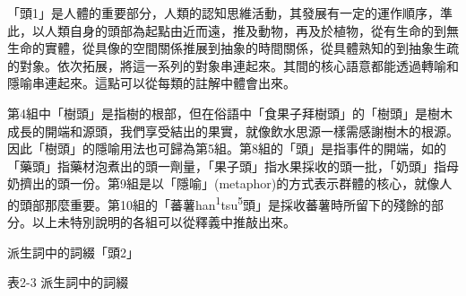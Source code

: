 \textrm{「頭1」是人體的重要部分，人類的認知思維活動，其發展有一定的運作順序，準此，以人類自身的頭部為起點由近而遠，推及動物，再及於植物，從有生命的到無生命的實體，從具像的空間關係推展到抽象的時間關係，從具體熟知的到抽象生疏的對象。依次拓展，將這一系列的對象串連起來。其間的核心語意都能透過轉喻和隱喻串連起來。這點可以從每類的註解中體會出來。}

\textrm{第4組中「樹頭」}是指樹的根部，但在俗語\textrm{中「食果子拜樹頭」的「樹頭」是樹木成長的開端和源頭，我們享受結出的果實，就像飲水思源一樣需感謝樹木的根源。}因此\textrm{「樹頭」}的隱喻用法也可歸為第5組。第8組的\textrm{「頭」}是指事件的開端，如的\textrm{「}藥\textrm{頭」}指藥材泡煮出的頭一劑量，\textrm{「}果子\textrm{頭」}指水果採收的頭一批，\textrm{「}奶\textrm{頭」}指母奶擠出的頭一份。\textrm{第9組是以「隱喻」(metaphor)的方式表示群體的核心，就像人的頭部那麼重要。第10組的「蕃薯han}\textrm{\textsuperscript{1}}\textrm{tsu}\textrm{\textsuperscript{5}}\textrm{頭」是採收蕃薯時所留下的殘餘的部分。}以上未特別說明的各組可以從釋義中推敲出來。

\textrm{派生詞中的詞綴「頭2」}

\rmfamily
表2-3 派生詞中的詞綴

\tablefirsthead{}

